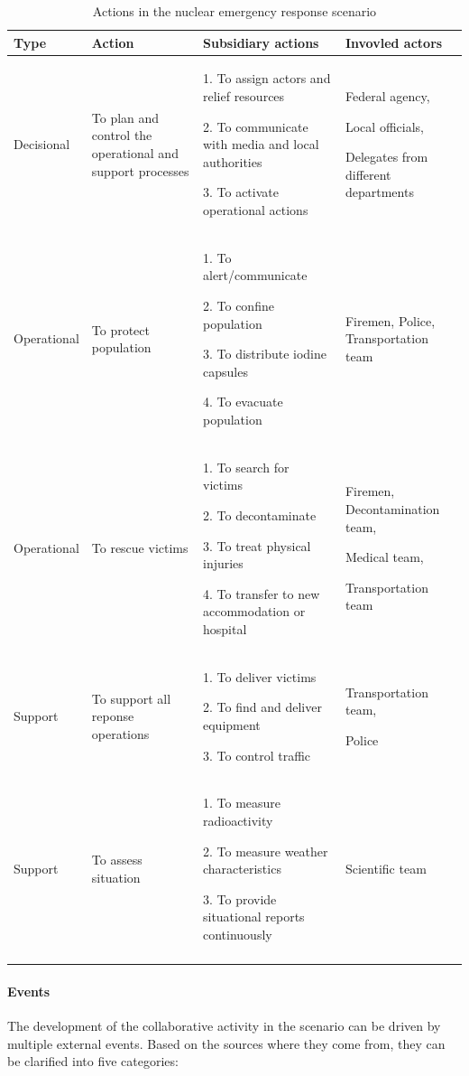 {\footnotesize
	\begin{longtable}{>{\raggedright}p{0.8in}>{\raggedright}p{1.7in}>{\raggedright}p{2in}>{\raggedright}p{1in}}
\toprule 
\textbf{Type} & \textbf{Action} & \textbf{Subsidiary actions} & \textbf{Invovled actors}\tabularnewline
\midrule 
Decisional & To plan and control the operational and support processes & 1. To assign actors and relief resources

2. To communicate with media and local authorities 

3. To activate operational actions & Federal agency,

Local officials,

Delegates from different departments\tabularnewline
\midrule 
Operational & To protect population & 1. To alert/communicate

2. To confine population

3. To distribute iodine capsules

4. To evacuate population & Firemen, Police, Transportation team\tabularnewline
\midrule 
Operational & To rescue victims & 1. To search for victims

2. To decontaminate

3. To treat physical injuries

4. To transfer to new accommodation or hospital & Firemen, Decontamination team,

Medical team,

Transportation team\tabularnewline
\midrule 
Support & To support all reponse operations & 1. To deliver victims

2. To find and deliver equipment

3. To control traffic & Transportation team, 

Police\tabularnewline
\midrule 
Support & To assess situation & 1. To measure radioactivity

2. To measure weather characteristics

3. To provide situational reports continuously & Scientific team\tabularnewline
\bottomrule
\caption{Actions in the nuclear emergency response scenario}
\label{tab:actions_in_scenario}
\end{longtable}
}

\paragraph*{Events} %
\label{par:events}
The development of the collaborative activity in the scenario can be driven by multiple external events. Based on the sources where they come from, they can be clarified into five categories:

